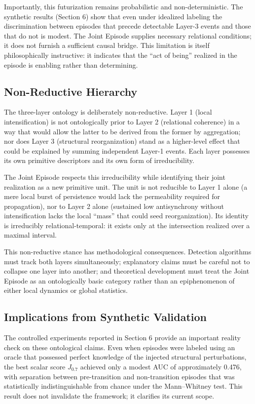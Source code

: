 Importantly, this futurization remains probabilistic and non-deterministic. The synthetic results (Section 6) show that even under idealized labeling the discrimination between episodes that precede detectable Layer-3 events and those that do not is modest. The Joint Episode supplies necessary relational conditions; it does not furnish a sufficient causal bridge. This limitation is itself philosophically instructive: it indicates that the ``act of being'' realized in the episode is enabling rather than determining.

\subsection{Non-Reductive Hierarchy}

The three-layer ontology is deliberately non-reductive. Layer 1 (local intensification) is not ontologically prior to Layer 2 (relational coherence) in a way that would allow the latter to be derived from the former by aggregation; nor does Layer 3 (structural reorganization) stand as a higher-level effect that could be explained by summing independent Layer-1 events. Each layer possesses its own primitive descriptors and its own form of irreducibility.

The Joint Episode respects this irreducibility while identifying their joint realization as a new primitive unit. The unit is not reducible to Layer 1 alone (a mere local burst of persistence would lack the permeability required for propagation), nor to Layer 2 alone (sustained low antisynchrony without intensification lacks the local ``mass'' that could seed reorganization). Its identity is irreducibly relational-temporal: it exists only at the intersection realized over a maximal interval.

This non-reductive stance has methodological consequences. Detection algorithms must track both layers simultaneously; explanatory claims must be careful not to collapse one layer into another; and theoretical development must treat the Joint Episode as an ontologically basic category rather than an epiphenomenon of either local dynamics or global statistics.

\subsection{Implications from Synthetic Validation}

The controlled experiments reported in Section 6 provide an important reality check on these ontological claims. Even when episodes were labeled using an oracle that possessed perfect knowledge of the injected structural perturbations, the best scalar score $J_{0.7}$ achieved only a modest AUC of approximately 0.476, with separation between pre-transition and non-transition episodes that was statistically indistinguishable from chance under the Mann--Whitney test. This result does not invalidate the framework; it clarifies its current scope.

